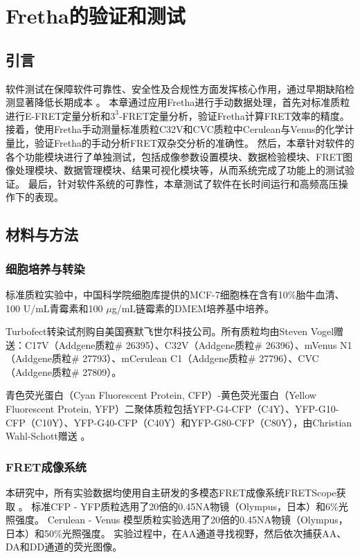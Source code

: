\chapter{Fretha的验证和测试}

\section{引言}
软件测试在保障软件可靠性、安全性及合规性方面发挥核心作用，通过早期缺陷检测显著降低长期成本 。
本章通过应用Fretha进行手动数据处理，首先对标准质粒进行E-FRET定量分析和$3^3$-FRET定量分析，验证Fretha计算FRET效率的精度。
接着，使用Fretha手动测量标准质粒C32V和CVC质粒中Cerulean与Venus的化学计量比，验证Fretha的手动分析FRET双杂交分析的准确性。
然后，本章针对软件的各个功能模块进行了单独测试，包括成像参数设置模块、数据检验模块、FRET图像处理模块、数据管理模块、结果可视化模块等，从而系统完成了功能上的测试验证。
最后，针对软件系统的可靠性，本章测试了软件在长时间运行和高频高压操作下的表现。

\section{材料与方法}
\subsection{细胞培养与转染}
\label{sec:细胞质粒}
标准质粒实验中，中国科学院细胞库提供的MCF-7细胞株在含有10\%胎牛血清、100 U/mL青霉素和100 $\mu$g/mL链霉素的DMEM培养基中培养。

Turbofect\texttrademark{}转染试剂购自美国赛默飞世尔科技公司。所有质粒均由Steven Vogel赠送：C17V（Addgene质粒\# 26395）、C32V（Addgene质粒\# 26396）、mVenus N1（Addgene质粒\# 27793）、mCerulean C1（Addgene质粒\# 27796）、CVC（Addgene质粒\# 27809）。

青色荧光蛋白（Cyan Fluorescent Protein, CFP）-黄色荧光蛋白（Yellow Fluorescent Protein, YFP）二聚体质粒包括YFP-G4-CFP（C4Y）、YFP-G10-CFP（C10Y）、YFP-G40-CFP（C40Y）和YFP-G80-CFP（C80Y），由Christian Wahl-Schott赠送 。

\subsection{FRET成像系统}
\label{sec:成像条件}
\ifshowtext
本研究中，所有实验数据均使用自主研发的多模态FRET成像系统FRETScope获取 。
标准CFP - YFP质粒选用了20倍的0.45NA物镜（Olympus，日本）和6\%光照强度。
Cerulean - Venus 模型质粒实验选用了20倍的0.45NA物镜（Olympus，日本）和50\%光照强度。
实验过程中，在AA通道寻找视野，然后依次捕获AA、DA和DD通道的荧光图像。

